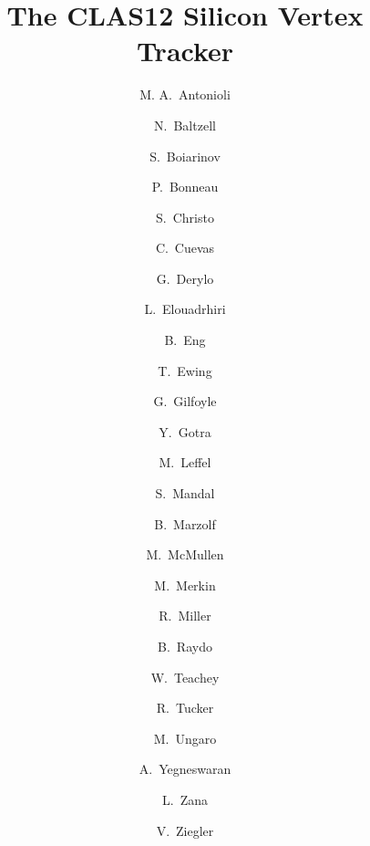 \title{The CLAS12 Silicon Vertex Tracker}

\author[A]{M. A.~Antonioli}
\author[A]{N.~Baltzell}
\author[A]{S.~Boiarinov}
\author[A]{P.~Bonneau}
\author[A]{S.~Christo}
\author[A]{C.~Cuevas}
\author[B]{G.~Derylo}
\author[A]{L.~Elouadrhiri}
\author[A]{B.~Eng}
\author[A]{T.~Ewing}
\author[C]{G.~Gilfoyle}
\author[A]{Y.~Gotra}
\author[A]{M.~Leffel}
\author[A]{S.~Mandal}
\author[A]{B.~Marzolf}
\author[A]{M.~McMullen}
\author[D]{M.~Merkin}
\author[A]{R.~Miller}
\author[A]{B.~Raydo}
\author[A]{W.~Teachey}
\author[E]{R.~Tucker}
\author[A]{M.~Ungaro}
\author[A]{A.~Yegneswaran}
\author[A]{L.~Zana}
\author[A]{V.~Ziegler}

\address[A]{Thomas Jefferson National Accelerator Facility, Newport News, VA, USA}
\address[B]{Fermi National Accelerator Laboratory, Batavia, IL, USA}
\address[C]{University of Richmond, Richmond, VA, USA}
\address[D]{Skobeltsyn Institute of Nuclear Physics, Moscow State University, Moscow, Russia}
\address[E]{Arizona State University, Tempe, AZ}

